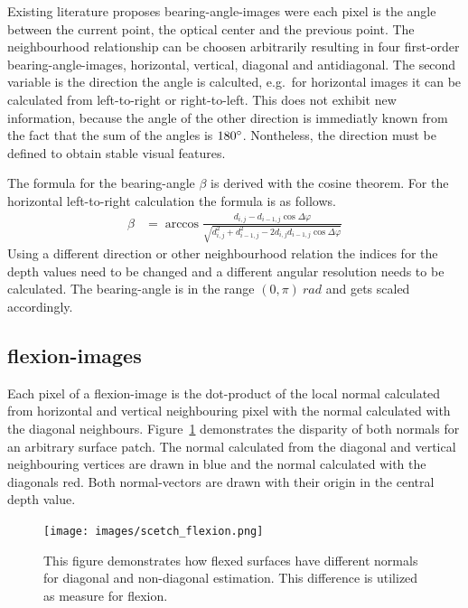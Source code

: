 \documentclass[doktyp=marbeit,fontsize=12pt,sprache=english,draft=true,hausschrift=true,fleqn]{TUBAFarbeiten}
\begin{document}
Existing literature\cite{Scaramuzza2007,Lin2017} proposes \Glspl{bearing-angle-image} were each pixel is the angle between the current point, the optical center and the previous point.
The neighbourhood relationship can be choosen arbitrarily resulting in four first-order \Glspl{bearing-angle-image}, horizontal, vertical, diagonal and antidiagonal.
The second variable is the direction the angle is calculted, e.g.~for horizontal images it can be calculated from left-to-right or right-to-left.
This does not exhibit new information, because the angle of the other direction is immediatly known from the fact that the sum of the angles is $180\degree$.
Nontheless, the direction must be defined to obtain stable visual features.

The formula for the \gls{bearing-angle} $\beta$ is derived with the cosine theorem.
For the horizontal left-to-right calculation the formula is as follows.
\begin{align}
    \beta&= \arccos%
            \frac{d_{i,j} - d_{i-1,j} \cos \Delta\varphi}%
                 {\sqrt{d_{i,j}^2 + d_{i-1,j}^2 - 2 d_{i,j} d_{i-1,j} \cos \Delta\varphi}}
\end{align}
Using a different direction or other neighbourhood relation the indices for the depth values need to be changed and a different angular resolution needs to be calculated.
The \Gls{bearing-angle} is in the range $(0, \pi)~rad$ and gets scaled accordingly.

\subsection{\Glspl{flexion-image}}\label{flexion-image-section}

Each pixel of a \Gls{flexion-image} is the dot-product of the local normal
calculated from horizontal and vertical neighbouring pixel with the
normal calculated with the diagonal neighbours.
Figure~\ref{fig:flexion-image-scetched} demonstrates the disparity of both normals for an arbitrary surface patch.
The normal calculated from the diagonal and vertical neighbouring vertices are drawn in blue and the normal calculated with the diagonals red.
Both normal-vectors are drawn with their origin in the central depth value.

\begin{figure}[H]
    \centering
    \texttt{[image: images/scetch\_flexion.png]}
    \caption[Schematic Representation of Flexion]{This figure demonstrates how flexed surfaces have different normals for diagonal and non-diagonal estimation. This difference is utilized as measure for flexion.}%
    \label{fig:flexion-image-scetched}
\end{figure}
\end{document}
